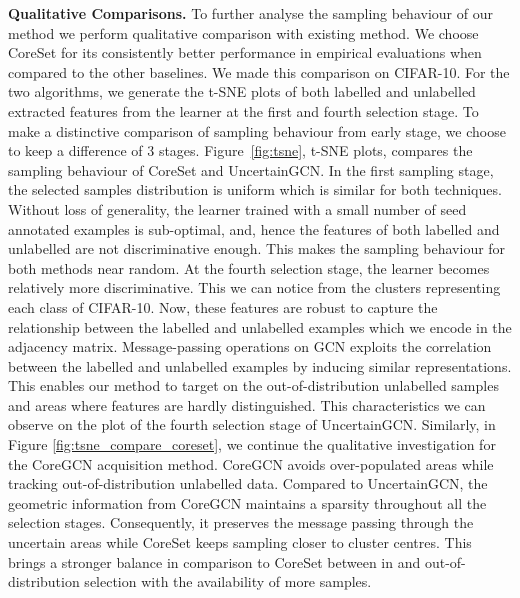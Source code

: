 \noindent \textbf{Qualitative Comparisons.}
To further analyse the sampling behaviour of our method we perform qualitative comparison with 
existing method. We choose CoreSet for its consistently better performance in 
empirical evaluations when compared to the other baselines.
We made this comparison on CIFAR-10.
For the two algorithms, we generate the t-SNE \cite{Maaten08visualizingdata} plots of 
both labelled and unlabelled extracted features from the learner at 
the first and fourth selection stage. To make a distinctive comparison of sampling behaviour 
from early stage, we choose to keep a difference 
of 3 stages. 
Figure~\ref{fig:tsne}, t-SNE plots, compares the sampling behaviour of CoreSet and UncertainGCN.
In the first sampling stage, the selected samples distribution
is uniform which is similar for both techniques. 
Without loss of generality, the learner trained with a small 
number of seed annotated examples is sub-optimal, and, hence 
the features of both labelled and unlabelled are not discriminative enough.
This makes the sampling behaviour for both methods near random. 
At the fourth selection stage, the learner becomes relatively more discriminative. 
This we can notice from the clusters representing each class of CIFAR-10.
Now, these features are robust to capture the relationship between the 
labelled and unlabelled examples which we encode in the adjacency matrix. 
Message-passing operations on GCN exploits the correlation between 
the labelled and unlabelled examples by inducing similar representations.
This enables our method to target on the out-of-distribution
unlabelled samples and areas where features are hardly distinguished. This characteristics we can observe 
on the plot of the fourth selection stage of UncertainGCN. 
Similarly, in Figure \ref{fig:tsne_compare_coreset}, 
we continue the qualitative investigation for the CoreGCN acquisition method.
CoreGCN avoids over-populated areas while tracking out-of-distribution unlabelled data.
Compared to UncertainGCN, the geometric information from CoreGCN maintains a 
sparsity throughout all the selection stages. Consequently, it preserves
the message passing through the uncertain areas while CoreSet keeps sampling 
closer to cluster centres. This brings a stronger balance in comparison to 
CoreSet between in and out-of-distribution selection with the availability of
more samples.


